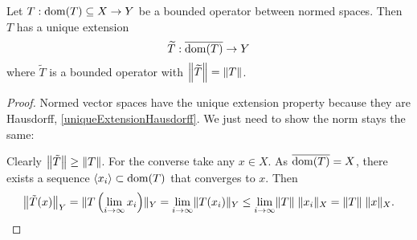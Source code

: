 \begin{proposition} \label{BLT}
Let $T:\dom(T)\subseteq X\to Y$ be a bounded operator between normed spaces. Then $T$ has a unique extension
\[ \widetilde{T}:\overline{\dom(T)}\to Y \]
where $\widetilde{T}$ is a bounded operator with $\norm*{\widetilde{T}} = \norm{T}$.
\end{proposition}
\begin{proof}
Normed vector spaces have the unique extension property because they are Hausdorff, \ref{uniqueExtensionHausdorff}. We just need to show the norm stays the same:

Clearly $\norm*{\tilde{T}} \geq \norm{T}$. For the converse take any $x\in X$. As $\overline{\dom(T)} = X$, there exists a sequence $\seq{x_i}\subset \dom(T)$ that converges to $x$. Then
\[ \norm*{\tilde{T}(x)}_Y = \norm{T\left(\lim_{i\to\infty}x_i\right)}_Y = \lim_{i\to\infty}\norm{T(x_i)}_Y \leq \lim_{i\to\infty}\norm{T}\;\norm{x_i}_X = \norm{T}\;\norm{x}_X. \]
\end{proof}


